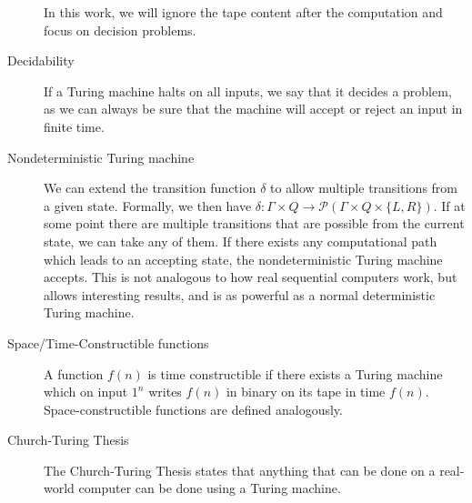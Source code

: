 \begin{description}
    In this work, we will ignore the tape content after the computation and focus on decision problems.
    \item[Decidability] If a Turing machine halts on all inputs, we say that it decides a problem, as we can always be sure that the machine will accept or reject an input in finite time.
    \item[Nondeterministic Turing machine] We can extend the transition function $\delta$ to allow multiple transitions from a given state.
    Formally, we then have $\delta : \Gamma \times Q \to \mathcal{P}(\Gamma \times Q \times \{L, R\})$.
    If at some point there are multiple transitions that are possible from the current state, we can take any of them.
    If there exists any computational path which leads to an accepting state, the nondeterministic Turing machine accepts.
    This is not analogous to how real sequential computers work, but allows interesting results, and is as powerful as a normal deterministic Turing machine.
    \item[Space/Time-Constructible functions] A function $f(n)$ is time constructible if there exists a Turing machine which on input $1^{n}$ writes $f(n)$ in binary on its tape in time $f(n)$.
    Space-constructible functions are defined analogously.
    \item[Church-Turing Thesis] The Church-Turing Thesis states that anything that can be done on a real-world computer can be done using a Turing machine.
\end{description}
